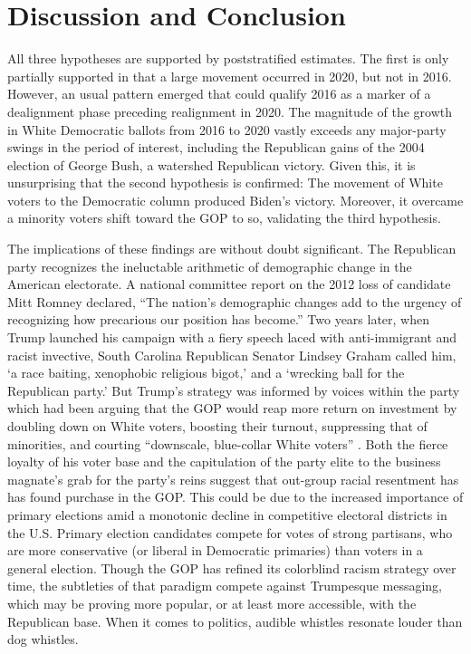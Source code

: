 \section{Discussion and Conclusion}

All three hypotheses are supported by poststratified estimates. The first is only partially supported in that a large movement occurred in 2020, but not in 2016. However, an usual pattern emerged that could qualify 2016 as a marker of a dealignment phase preceding realignment in 2020. The magnitude of the growth in White Democratic ballots from 2016 to 2020 vastly exceeds any major-party swings in the period of interest, including the Republican gains of the 2004 election of George Bush, a watershed Republican victory. Given this, it is unsurprising that the second hypothesis is confirmed: The movement of White voters to the Democratic column produced Biden's victory. Moreover, it overcame a minority voters shift toward the GOP to so, validating the third hypothesis.  

The implications of these findings are without doubt significant. The Republican party recognizes the ineluctable arithmetic of demographic change in the American electorate. A national committee report on the 2012 loss of candidate Mitt Romney declared, ``The nation's demographic changes add to the urgency of recognizing how precarious our position has become.'' Two years later, when Trump launched his campaign with a fiery speech laced with anti-immigrant and racist invective, South Carolina Republican Senator Lindsey Graham called him, `a race baiting, xenophobic religious bigot,' and a `wrecking ball for the Republican party.' But Trump's strategy was informed by voices within the party which had been arguing that the GOP would reap more return on investment by doubling down on White voters, boosting their turnout, suppressing that of minorities, and courting ``downscale, blue-collar White voters'' \citep{trende_lost_1994, trende_demographics_2015}. Both the fierce loyalty of his voter base and the capitulation of the party elite to the business magnate's grab for the party's reins suggest that out-group racial resentment has has found purchase in the GOP. This could be due to the increased importance of primary elections amid a monotonic decline in competitive electoral districts in the U.S. Primary election candidates compete for votes of strong partisans, who are more conservative (or liberal in Democratic primaries) than voters in a general election. Though the GOP has refined its colorblind racism strategy over time, the subtleties of that paradigm compete against Trumpesque messaging, which may be proving more popular, or at least more accessible, with the Republican base. When it comes to politics, audible whistles resonate louder than dog whistles.       

